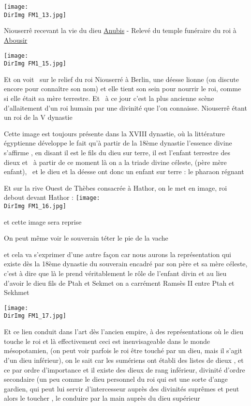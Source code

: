 \documentclass[a4paper]{article}
\newcommand{\DirImg}{../img/FaivreMartin/}
\begin{document}
\texttt{[image: \\DirImg FM1\_13.jpg]} 


Niouserrê recevant la vie du dieu
\href{http://fr.wikipedia.org/wiki/Anubis}{\textcolor[rgb]{0.0,0.21960784,0.62352943}{Anubis}} - Relevé du temple
funéraire du roi à \href{http://fr.wikipedia.org/wiki/Abousir}{\textcolor[rgb]{0.0,0.21960784,0.62352943}{Abousir}}


\texttt{[image: \\DirImg FM1\_15.jpg]} 


Et on voit \ sur le relief du roi Niouserré à Berlin, une déesse lionne (on discute encore pour connaître son nom) et
elle tient son sein pour nourrir le roi, comme si elle était sa mère terrestre. Et \ à ce jour c'est la plus ancienne
scène d'allaitement d'un roi humain par une divinité que l'on connaisse. Niouserrê étant un roi de la V dynastie


Cette image est toujours présente dans la XVIII dynastie, où la littérature égyptienne développe le fait qu'à partir de
la 18ème dynastie l'essence divine s'affirme , en disant {\textquotedbl} il est le fils du dieu sur terre, il est
l'enfant terrestre des dieux et \ à partir de ce moment là on a la triade divine céleste, (père mère enfant), \ et le
dieu et la déesse ont donc un enfant sur terre : le pharaon régnant


Et sur la rive Ouest de Thèbes consacrée à Hathor, on le met en image, roi debout devant Hathor :
\texttt{[image: \\DirImg FM1\_16.jpg]}


et cette image sera reprise


On peut même voir le souverain téter le pie de la vache


et cela va s'exprimer d'une autre façon car nous aurons la représentation qui existe dès la 18ème dynastie du souverain
encadré par son père et sa mère céleste, c'est à dire que là le prend véritablement le rôle de l'enfant divin et au
lieu d'avoir le dieu fils de Ptah et Sekmet on a carrément Ramsès II entre Ptah et Sekhmet


\texttt{[image: \\DirImg FM1\_17.jpg]} 


Et ce lien conduit dans l'art dès l'ancien empire, à des représentations où le dieu touche le roi et là effectivement
ceci est inenvisageable dans le monde mésopotamien, (on peut voir parfois le roi être touché par un dieu, mais il
s'agit d'un dieu inférieur), on le sait car les sumériens ont établi des listes de dieux , et ce par ordre d'importance
et il existe des dieux de rang inférieur, divinité d'ordre secondaire (un peu comme le dieu personnel du roi qui est
une sorte d'ange gardien, qui peut lui servir d'intercesseur auprès des divinités suprêmes et peut alors le toucher ,
le conduire par la main auprès du dieu supérieur
\end{document}

